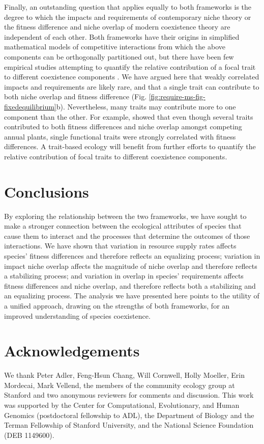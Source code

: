 Finally, an outstanding question that applies equally to both frameworks is the degree to which the impacts and requirements of contemporary niche theory or the fitness difference and niche overlap of modern coexistence theory are independent of each other. Both frameworks have their origins in simplified mathematical models of competitive interactions from which the above components can be orthogonally partitioned out, but there have been few empirical studies attempting to quantify the relative contribution of a focal trait to different coexistence components \citep[but see][]{Kraft2015}. We have argued here that weakly correlated impacts and requirements are likely rare, and that a single trait can contribute to both niche overlap and fitness difference (Fig. \ref{fig:require-ms-fig-fixedequilibrium}b). Nevertheless, many traits may contribute more to one component than the other. For example, \citet{Kraft2015} showed that even though several traits contributed to both fitness differences and niche overlap amongst competing annual plants, single functional traits were strongly correlated with fitness differences. A trait-based ecology will benefit from further efforts to quantify the relative contribution of focal traits to different coexistence components.
\par



\section{Conclusions}
By exploring the relationship between the two frameworks, we have sought to make a stronger connection between the ecological attributes of species that cause them to interact and the processes that determine the outcomes of those interactions. We have shown that variation in resource supply rates affects species' fitness differences and therefore reflects an equalizing process; variation in impact niche overlap affects the magnitude of niche overlap and therefore reflects a stabilizing process; and variation in overlap in species' requirements affects fitness differences and niche overlap, and therefore reflects both a stabilizing and an equalizing process. The analysis we have presented here points to the utility of a unified approach, drawing on the strengths of both frameworks, for an improved understanding of species coexistence.
\par



\section{Acknowledgements}
We thank Peter Adler, Feng-Hsun Chang, Will Cornwell, Holly Moeller, Erin Mordecai, Mark Vellend, the members of the community ecology group at Stanford and two anonymous reviewers for comments and discussion. This work was supported by the Center for Computational, Evolutionary, and Human Genomics (postdoctoral fellowship to ADL), the Department of Biology and the Terman Fellowship of Stanford University, and the National Science Foundation (DEB 1149600). 



